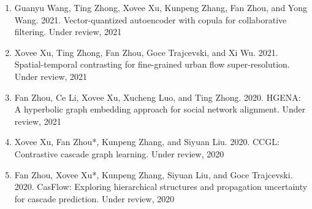 \begin{enumerate}[resume]
    \item Guanyu Wang, Ting Zhong, Xovee Xu, Kunpeng Zhang, Fan Zhou, and Yong Wang. 2021. Vector-quantized autoencoder with copula for collaborative filtering. Under review, 2021 
    \item Xovee Xu, Ting Zhong, Fan Zhou, Goce Trajcevski, and Xi Wu. 2021. Spatial-temporal contrasting for fine-grained urban flow super-resolution. Under review, 2021
    \item Fan Zhou, Ce Li, Xovee Xu, Xucheng Luo, and Ting Zhong. 2020. HGENA: A hyperbolic graph embedding approach for social network alignment. Under review, 2021
    \item Xovee Xu, Fan Zhou*, Kunpeng Zhang, and Siyuan Liu. 2020. CCGL: Contrastive cascade graph learning. Under review, 2020
    \item Fan Zhou, Xovee Xu*, Kunpeng Zhang, Siyuan Liu, and Goce Trajcevski. 2020. CasFlow: Exploring hierarchical structures and propagation uncertainty for cascade prediction. Under review, 2020
\end{enumerate}